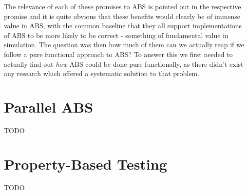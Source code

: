 The relevance of each of these promises to ABS is pointed out in the respective promise and it is quite obvious that these benefits would clearly be of immense value in ABS, with the common baseline that they all support implementations of ABS to be more likely to be correct - something of fundamental value in simulation. The question was then how much of them can we actually reap if we follow a pure functional approach to ABS? To answer this we first needed to actually find out \textit{how} ABS could be done pure functionally, as there didn't exist any research which offered a systematic solution to that problem.





\section{Parallel ABS}
TODO

\section{Property-Based Testing}
TODO


